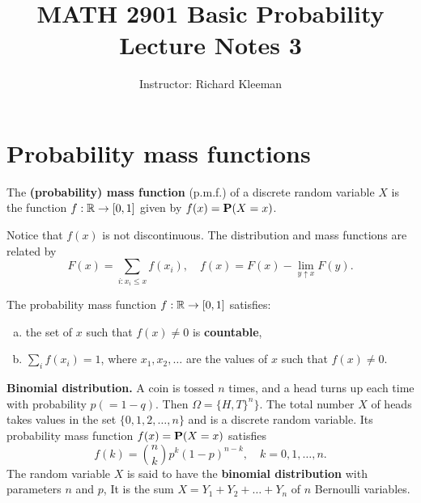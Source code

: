 


\title{MATH 2901 Basic Probability Lecture Notes 3}
\author{Instructor: Richard Kleeman}
\date{}
\maketitle


\section{Probability mass functions}
\begin{definition}
The \textbf{(probability) mass function} (p.m.f.) of a discrete random variable $X$ is the function $f: \mathbb{R} \to[0, 1]$ given by $f(x) = \mathbf{P}(X = x)$. 
\end{definition}

Notice that $f(x)$ is not discontinuous. The distribution and mass functions are related by
\begin{equation*}
    F(x) = \sum_{i: x_i \leq x} f(x_i), \quad f(x) = F(x) - \lim_{y\uparrow x} F(y).
\end{equation*}

\begin{lemma}
The probability mass function $f: \mathbb{R} \to [0, 1]$ satisfies: 
\begin{enumerate}[(a)]
    \item the set of $x$ such that $f(x) \neq 0$ is \textbf{countable},
    \item $\sum_{i} f(x_i) = 1$, where $x_1, x_2, \dots$ are the values of $x$ such that $f(x)\neq 0$.
\end{enumerate}
\end{lemma}

\begin{example}
\textbf{Binomial distribution.} A coin is tossed $n$ times, and a head turns up each time with probability $p (= 1 - q)$. Then $\Omega = \{H, T\}^n \}$. The total number $X$ of heads takes values in the set $\{0, 1, 2, \dots , n\}$ and is a discrete random variable. Its probability mass function $f(x) = \mathbf{P}(X = x)$ satisfies 
\begin{equation*}
    f(k)= \binom{n}{k} p^{k}(1-p)^{n-k}, \quad k=0,1, \ldots, n.
\end{equation*}
The random variable $X$ is said to have the \textbf{binomial distribution} with parameters $n$ and $p$, It is the sum $X = Y_1 + Y_2 + \dots + Y_n$ of $n$ Bernoulli variables.
\end{example}

